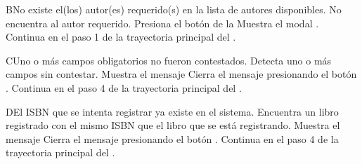 
\begin{UCtrayectoriaA}{B}{No existe el(los) autor(es) requerido(s) en la lista de autores disponibles.}
    \UCpaso[\UCactor] No encuentra al autor requerido.
    \UCpaso[\UCactor] Presiona el botón  de la 
    \UCpaso Muestra el modal .
    \UCpaso Continua en el paso 1 de la trayectoria principal del .
\end{UCtrayectoriaA}


\begin{UCtrayectoriaA}{C}{Uno o más campos obligatorios no fueron contestados.}
    \UCpaso Detecta uno o más campos sin contestar.
    \UCpaso Muestra el mensaje 
    \UCpaso[\UCactor] Cierra el mensaje presionando el botón .
    \UCpaso Continua en el paso 4 de la trayectoria principal del .
\end{UCtrayectoriaA}


\begin{UCtrayectoriaA}{D}{El ISBN que se intenta registrar ya existe en el sistema.}
    \UCpaso Encuentra un libro registrado con el mismo ISBN que el libro que se está registrando.
    \UCpaso Muestra el mensaje 
    \UCpaso[\UCactor] Cierra el mensaje presionando el botón .
    \UCpaso Continua en el paso 4 de la trayectoria principal del .
\end{UCtrayectoriaA}